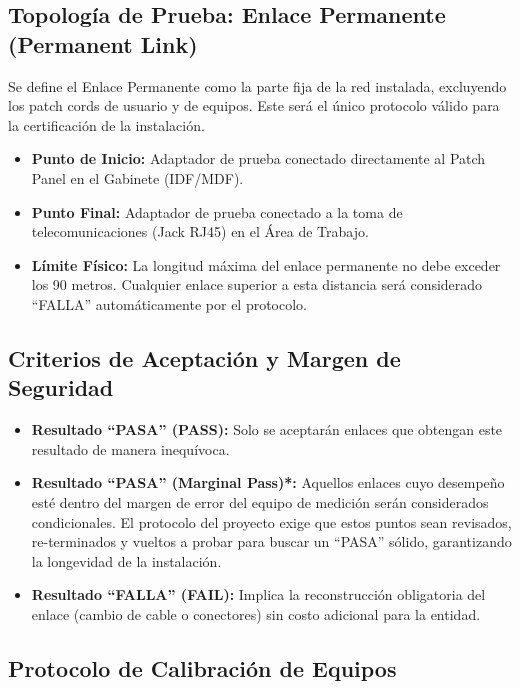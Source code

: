 \subsection*{Topología de Prueba: Enlace Permanente (Permanent Link)}

Se define el Enlace Permanente como la parte fija de la red instalada, excluyendo los patch cords de usuario y de equipos. Este será el único protocolo válido para la certificación de la instalación.

\begin{itemize}
    \item \textbf{Punto de Inicio:} Adaptador de prueba conectado directamente al Patch Panel en el Gabinete (IDF/MDF).
    \item \textbf{Punto Final:} Adaptador de prueba conectado a la toma de telecomunicaciones (Jack RJ45) en el Área de Trabajo.
    \item \textbf{Límite Físico:} La longitud máxima del enlace permanente no debe exceder los 90 metros. Cualquier enlace superior a esta distancia será considerado ``FALLA'' automáticamente por el protocolo.
\end{itemize}

\subsection*{Criterios de Aceptación y Margen de Seguridad}

\begin{itemize}
    \item \textbf{Resultado ``PASA'' (PASS):} Solo se aceptarán enlaces que obtengan este resultado de manera inequívoca.
    \item \textbf{Resultado ``PASA'' (Marginal Pass)*:} Aquellos enlaces cuyo desempeño esté dentro del margen de error del equipo de medición serán considerados condicionales. El protocolo del proyecto exige que estos puntos sean revisados, re-terminados y vueltos a probar para buscar un ``PASA'' sólido, garantizando la longevidad de la instalación.
    \item \textbf{Resultado ``FALLA'' (FAIL):} Implica la reconstrucción obligatoria del enlace (cambio de cable o conectores) sin costo adicional para la entidad.
\end{itemize}

\subsection*{Protocolo de Calibración de Equipos}

